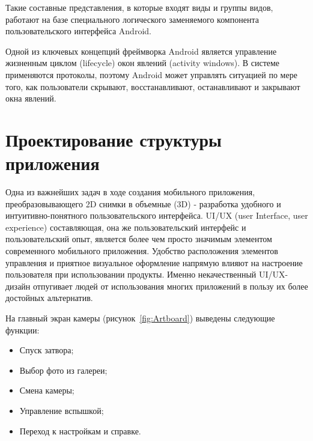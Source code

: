 Такие составные представления, в которые входят виды и группы видов, работают на базе специального логического заменяемого компонента пользовательского интерфейса Android.

Одной из ключевых концепций фреймворка Android является управление жизненным циклом (lifecycle) окон явлений (activity windows). В системе применяются протоколы, поэтому Android может управлять ситуацией по мере того, как пользователи скрывают, восстанавливают, останавливают и закрывают окна явлений.


\section{Проектирование структуры приложения}

Одна из важнейших задач в ходе создания мобильного приложения, преобразовывающего 2D снимки в объемные (3D) - разработка удобного и интуитивно-понятного пользовательского интерфейса. UI/UX (user Interface, user experience) составляющая, она же пользовательский интерфейс и пользовательский опыт, является более чем просто значимым элементом современного мобильного приложения. Удобство расположения элементов управления и приятное визуальное оформление напрямую влияют на настроение пользователя при использовании продукты. Именно некачественный UI/UX-дизайн отпугивает людей от использования многих приложений в пользу их более достойных альтернатив.

На главный экран камеры (рисунок~\ref{fig:Artboard}) выведены следующие функции:

\begin{itemize}
	\item Спуск затвора;
	\item Выбор фото из галереи;
	\item Смена камеры;
	\item Управление вспышкой;
	\item Переход к настройкам и справке.
\end{itemize}

